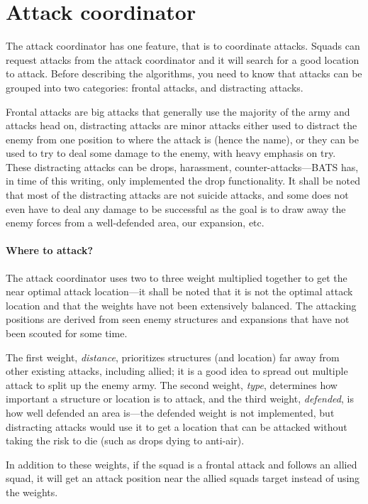 
\section{Attack coordinator}
\label{sec:attack_coordinator}
The attack coordinator has one feature, that is to coordinate attacks. Squads can request attacks from the attack coordinator and it will search for a good location to attack. Before describing the algorithms, you need to know that attacks can be grouped into two categories: frontal attacks, and distracting attacks.

Frontal attacks are big attacks that generally use the majority of the army and attacks head on, distracting attacks are minor attacks either used to distract the enemy from one position to where the attack is (hence the name), or they can be used to try to deal some damage to the enemy, with heavy emphasis on try. These distracting attacks can be drops, harassment, counter-attacks—BATS has, in time of this writing, only implemented the drop functionality. It shall be noted that most of the distracting attacks are not suicide attacks, and some does not even have to deal any damage to be successful as the goal is to draw away the enemy forces from a well-defended area, our expansion, etc.

\paragraph{Where to attack?}
The attack coordinator uses two to three weight multiplied together to get the near optimal attack location—it shall be noted that it is not the optimal attack location and that the weights have not been extensively balanced. The attacking positions are derived from seen enemy structures and expansions that have not been scouted for some time.

The first weight, \emph{distance}, prioritizes structures (and location) far away from other existing attacks, including allied; it is a good idea to spread out multiple attack to split up the enemy army. The second weight, \emph{type}, determines how important a structure or location is to attack, and the third weight, \emph{defended}, is how well defended an area is—the defended weight is not implemented, but distracting attacks would use it to get a location that can be attacked without taking the risk to die (such as drops dying to anti-air).

In addition to these weights, if the squad is a frontal attack and follows an allied squad, it will get an attack position near the allied squads target instead of using the weights.


